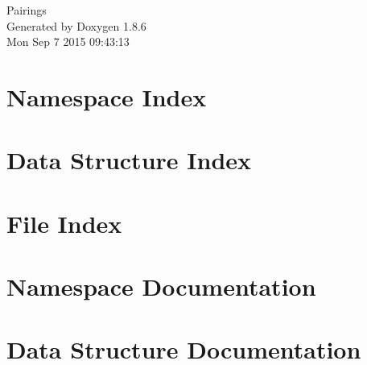 \documentclass[twoside]{book}
\newcommand{\clearemptydoublepage}{%
  \newpage{\pagestyle{empty}\cleardoublepage}%
}
\begin{document}
\hypersetup{pageanchor=false}
\begin{titlepage}
\vspace*{7cm}
\begin{center}%
{\Large Pairings }\\
\vspace*{1cm}
{\large Generated by Doxygen 1.8.6}\\
\vspace*{0.5cm}
{\small Mon Sep 7 2015 09:43:13}\\
\end{center}
\end{titlepage}
\clearemptydoublepage
\tableofcontents
\clearemptydoublepage
{}
\hypersetup{pageanchor=true}

\chapter{Namespace Index}

\chapter{Data Structure Index}

\chapter{File Index}

\chapter{Namespace Documentation}




\chapter{Data Structure Documentation}
















\end{document}
